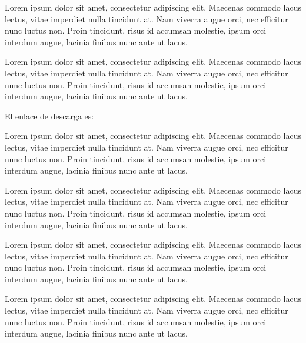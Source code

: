 \begin{pcdos}
    Lorem ipsum dolor sit amet, consectetur adipiscing elit. Maecenas commodo lacus lectus, vitae imperdiet nulla tincidunt at. Nam viverra augue orci, nec efficitur nunc luctus non. Proin tincidunt, risus id accumsan molestie, ipsum orci interdum augue, lacinia finibus nunc ante ut lacus.
\end{pcdos}

\begin{pctres}
    Lorem ipsum dolor sit amet, consectetur adipiscing elit. Maecenas commodo lacus lectus, vitae imperdiet nulla tincidunt at. Nam viverra augue orci, nec efficitur nunc luctus non. Proin tincidunt, risus id accumsan molestie, ipsum orci interdum augue, lacinia finibus nunc ante ut lacus.
\end{pctres}

\begin{pccuatro}
    El enlace de descarga es:
\end{pccuatro}


\begin{pncero}
    Lorem ipsum dolor sit amet, consectetur adipiscing elit. Maecenas commodo lacus lectus, vitae imperdiet nulla tincidunt at. Nam viverra augue orci, nec efficitur nunc luctus non. Proin tincidunt, risus id accumsan molestie, ipsum orci interdum augue, lacinia finibus nunc ante ut lacus.
\end{pncero}

\begin{pnuno}
    Lorem ipsum dolor sit amet, consectetur adipiscing elit. Maecenas commodo lacus lectus, vitae imperdiet nulla tincidunt at. Nam viverra augue orci, nec efficitur nunc luctus non. Proin tincidunt, risus id accumsan molestie, ipsum orci interdum augue, lacinia finibus nunc ante ut lacus.
\end{pnuno}

\begin{pndos}[Título]
    Lorem ipsum dolor sit amet, consectetur adipiscing elit. Maecenas commodo lacus lectus, vitae imperdiet nulla tincidunt at. Nam viverra augue orci, nec efficitur nunc luctus non. Proin tincidunt, risus id accumsan molestie, ipsum orci interdum augue, lacinia finibus nunc ante ut lacus.
\end{pndos}

\begin{pntres}
    Lorem ipsum dolor sit amet, consectetur adipiscing elit. Maecenas commodo lacus lectus, vitae imperdiet nulla tincidunt at. Nam viverra augue orci, nec efficitur nunc luctus non. Proin tincidunt, risus id accumsan molestie, ipsum orci interdum augue, lacinia finibus nunc ante ut lacus.
\end{pntres}